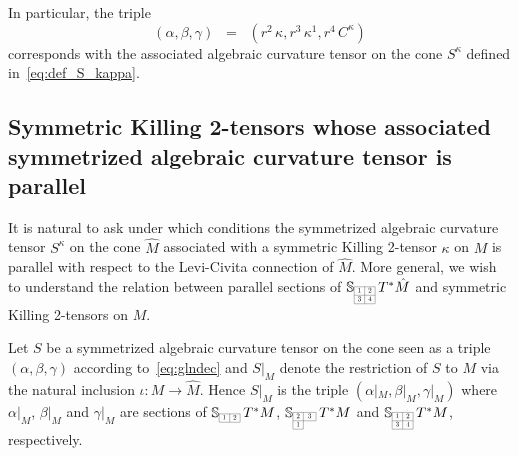 \documentclass[11pt,a4paper]{article}
\theoremstyle{plain}
\theoremstyle{remark}
\newcommand{\bbS}{\mathbb{S}}
\begin{document}
In particular, the triple
\begin{equation}\label{eq:zerlegung_von_kappa_dach}
\left ( \alpha,\beta,\gamma \right ) %
\;\;=\;\; \left (r^2\, \kappa, r^3\,\kappa^1, r^4\,C^\kappa\right )
\end{equation}
corresponds with the associated algebraic curvature tensor on the cone $S^\kappa$ defined in~\eqref{eq:def_S_kappa}.

\subsection{Symmetric Killing 2-tensors whose associated symmetrized algebraic curvature tensor is parallel}
It is natural to ask under which conditions the symmetrized algebraic curvature
tensor $S^\kappa$ on the cone $\hat M$ associated with a symmetric Killing 2-tensor
$\kappa$ on $M$ is parallel with respect to the Levi-Civita connection of
$\hat M$. More general, we wish to understand the relation between parallel 
sections of $\bbS_{\scaleto{\begin{array}{|c|c|}
\cline{1-2}
1 & 2 \\
\cline{1-2}
3 & 4 \\
\cline{1-2}
\end{array}}{12pt}}\, T^*\hat M$  and symmetric Killing 2-tensors on $M$.


Let $S$ be a symmetrized algebraic curvature tensor on the cone 
seen as a triple $(\alpha,\beta,\gamma)$ according to~\eqref{eq:glndec}
and $S|_M$ denote the restriction of $S$ to $M$ via the natural inclusion $\iota \colon M \to \hat M$. 
Hence  $S|_M$ is the triple $(\alpha|_M,\beta|_M,\gamma|_M)$ where $\alpha|_M$, $\beta|_M$ and $\gamma|_M$ are sections of 
$\bbS_{\scaleto{\begin{array}{|c|c|}
\cline{1-2}
1 & 2 \\
\cline{1-2}
\end{array}}{6pt}}\,T^*M $, $\bbS_{\scaleto{\begin{array}{|c|c|}
\cline{1-2}
2 & 3 \\
\cline{1-2}
1 & \multicolumn{1}{c}{\;\;\;} \\
\cline{1-1}
\end{array}}{12pt}}\, T^*M$ and  $\bbS_{\scaleto{\begin{array}{|c|c|}
\cline{1-2}
1 & 2 \\
\cline{1-2}
3 & 4 \\
\cline{1-2}
\end{array}}{12pt}}\, T^*M$, respectively.
\end{document}
